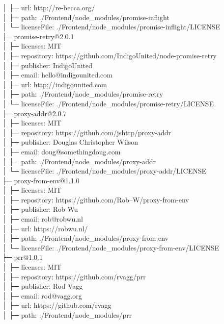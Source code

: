 │  ├─ url: http://re-becca.org/\\
│  ├─ path: ./Frontend/node\_modules/promise-inflight\\
│  └─ licenseFile: ./Frontend/node\_modules/promise-inflight/LICENSE\\
├─ promise-retry@2.0.1\\
│  ├─ licenses: MIT\\
│  ├─ repository: https://github.com/IndigoUnited/node-promise-retry\\
│  ├─ publisher: IndigoUnited\\
│  ├─ email: hello@indigounited.com\\
│  ├─ url: http://indigounited.com\\
│  ├─ path: ./Frontend/node\_modules/promise-retry\\
│  └─ licenseFile: ./Frontend/node\_modules/promise-retry/LICENSE\\
├─ proxy-addr@2.0.7\\
│  ├─ licenses: MIT\\
│  ├─ repository: https://github.com/jshttp/proxy-addr\\
│  ├─ publisher: Douglas Christopher Wilson\\
│  ├─ email: doug@somethingdoug.com\\
│  ├─ path: ./Frontend/node\_modules/proxy-addr\\
│  └─ licenseFile: ./Frontend/node\_modules/proxy-addr/LICENSE\\
├─ proxy-from-env@1.1.0\\
│  ├─ licenses: MIT\\
│  ├─ repository: https://github.com/Rob--W/proxy-from-env\\
│  ├─ publisher: Rob Wu\\
│  ├─ email: rob@robwu.nl\\
│  ├─ url: https://robwu.nl/\\
│  ├─ path: ./Frontend/node\_modules/proxy-from-env\\
│  └─ licenseFile: ./Frontend/node\_modules/proxy-from-env/LICENSE\\
├─ prr@1.0.1\\
│  ├─ licenses: MIT\\
│  ├─ repository: https://github.com/rvagg/prr\\
│  ├─ publisher: Rod Vagg\\
│  ├─ email: rod@vagg.org\\
│  ├─ url: https://github.com/rvagg\\
│  ├─ path: ./Frontend/node\_modules/prr\\
